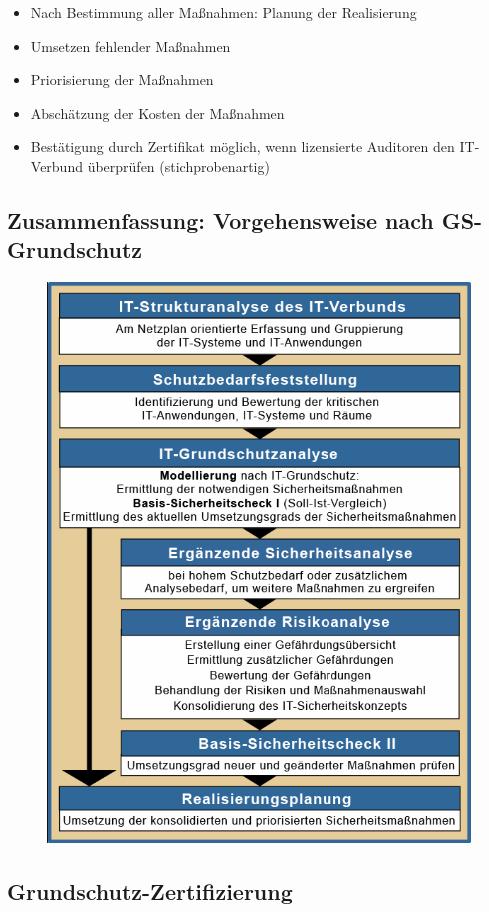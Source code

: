 \documentclass[openany]{book}
\begin{document}
\begin{itemize}
    \item Nach Bestimmung aller Maßnahmen: Planung der Realisierung
    \item Umsetzen fehlender Maßnahmen
    \item Priorisierung der Maßnahmen
    \item Abschätzung der Kosten der Maßnahmen
    \item Bestätigung durch Zertifikat möglich, wenn lizensierte Auditoren den IT-Verbund überprüfen (stichprobenartig)
\end{itemize}

\newpage

\subsection{Zusammenfassung: Vorgehensweise nach GS-Grundschutz}

\begin{figure}[h!]
    \centering
    \includegraphics[width=0.85\linewidth]{Pics/GS-Grundschutz-Zusammenfassung.PNG}
\end{figure}

\subsection{Grundschutz-Zertifizierung}
\end{document}
